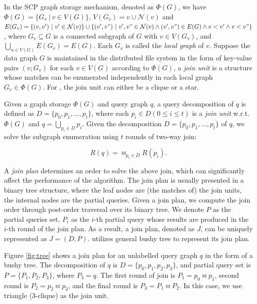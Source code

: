  In the SCP graph storage mechanism, denoted as $\Phi(G)$, we have $\Phi(G)=\{G_v\ |\ v\in V(G)\}$, $V(G_v)={v}\cup\mathcal{N}(v)$ and $E(G_v)=\{(v,v')\ |\ v'\in\mathcal{N}(v)\}\cup\{(v',v")\ |\ v',v"\in\mathcal{N}(v)\wedge(v',v")\in E(G)\wedge v<v'\wedge v<v"\}$, where $G_v\subseteq G$ is a connected subgraph of $G$ with $v\in V(G_v)$, and $\bigcup_{u\in V(G)}E(G_v)=E(G)$. Each $G_v$ is called the \textit{local graph} of $v$. Suppose the data graph $G$ is maintained in the distributed file system in the form of key-value pairs $(v;G_v)$ for each $v\in V(G)$ according to $\Phi(G)$, a \textit{join unit} is a structure whose matches can be enumerated independently in each local graph $G_v\in \Phi(G)$. For \cliquejoin, the join unit can either be a clique or a star. 

 Given a graph storage $\Phi(G)$ and query graph $q$, a query decomposition of $q$ is defined as $D=\{p_0,p_1,\dots,p_t\}$, where each $p_i\in D(0\leq i\leq t)$ is a \textit{join unit} w.r.t. $\Phi(G)$ and $q = \bigcup_{p_i\in D}p_i$. Given the decomposition $D=\{p_0,p_1,\dots,p_t\}$ of $q$, we solve the subgraph enumeration using $t$ rounds of two-way join:

\begin{equation} \label{eq:1}
R(q) = \bowtie_{p_i\in D}R(p_i).
\end{equation}

 A \textit{join plan} determines an order to solve the above join, which can significantly affect the performance of the algorithm. The join plan is usually presented in a binary tree structure, where the leaf nodes are (the matches of) the join units, the internal nodes are the partial queries. Given a join plan, we compute the join order through post-order traversal \cite{postorder} over its binary tree. We denote $P$ as the partial queries set, $P_i$ as the $i$-th partial query whose results are produced in the $i$-th round of the join plan. As a result, a join plan, denoted as $J$, can be uniquely represented as $J = (D, P)$. \cliquejoin utilizes general bushy tree \cite{tree} to represent its join plan. \\

\begin{example}
Figure \ref{fig:tree} shows a join plan for an unlabelled query graph $q$ in the form of a bushy tree. The decomposition of $q$ is $D=\{p_0, p_1, p_2, p_3\}$, and partial query set is $P=\{P_1, P_2, P_3\}$, where $P_3=q$. The first round of join is $P_1 = p_0 \Join p_1$, second round is $P_2=p_2 \Join p_3$, and the final round is $P_3 = P_1 \Join P_2$. In this case, we use triangle ($3$-clique) as the join unit.
\end{example}

